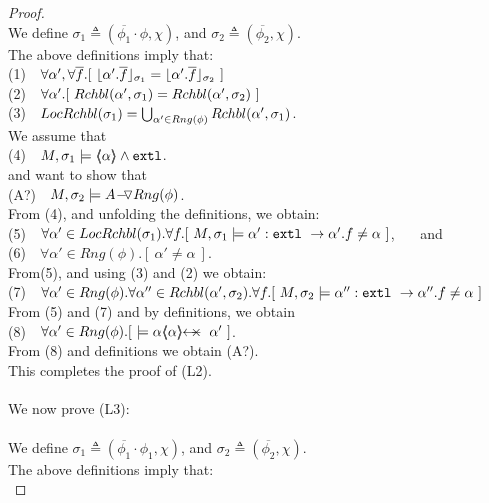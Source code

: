 \begin{proof}
  ~ \\
 We define $\sigma_1 \triangleq (\overline {\phi_1}\cdot \phi,\chi)$, and  $\sigma_2 \triangleq (\overline {\phi_2},\chi) $.\\
The above definitions imply that: \\
\SP (1)\ \ $\forall \alpha',\forall \overline f.[\  \interpret {\sigma_1} {\alpha'.\overline f} =  \interpret {\sigma_2} {\alpha'.\overline f}\ ]$\\
\SP (2)\ \ $\forall \alpha'.[\  \Relevant {\alpha'} {\sigma_1} = \Relevant {\alpha'} {\sigma_2}\ ]$\\
\SP (3)\ \ $\LRelevantO {\sigma_1} = \bigcup_{\alpha'\in Rng(\phi)} \Relevant {\alpha'} {\sigma_1}$.\\
We   assume that\\
\SP (4)\ \  $M, \sigma_1 \models \inside \alpha \wedge \extThis$.\\
and want to show that\\
\SP (A?)\ \ $M, \sigma_2 \models \PushASLong  {Rng(\phi)} {A}$.\\
From (4), and unfolding the definitions, we obtain:\\
\SP (5)\ \  $\forall \alpha'\in \LRelevantO {\sigma_1}.\forall f.[ \   M, \sigma_1 \models \alpha':\prg{extl}\ \rightarrow \alpha'.f  \neq \alpha\ ]$, \ \ \ and\\
\SP (6)\ \ $\forall \alpha'\in Rng (\phi). [ \ \alpha'\neq \alpha \ ]$.\\
From(5), and using (3) and (2) we obtain:
\\
\SP (7)\ \  $\forall \alpha'\in Rng(\phi).\forall \alpha'' \in\Relevant {\alpha'} {\sigma_2}.\forall f.[ \   M, \sigma_2 \models \alpha'':\prg{extl}\ \rightarrow \alpha''.f  \neq \alpha\ ]$\\
From (5) and (7) and by definitions, we obtain
\\
\SP (8)\ \  $\forall \alpha'\in Rng (\phi).[ \   \models \alpha \protectedFrom \alpha {\alpha'}\ ]$.\\
From (8) and definitions we obtain (A?).\\
This completes the proof of (L2). 
 \\
  $\strut ~ \ $\\
  We now prove (L3): \\
  ~ \\
 We define $\sigma_1 \triangleq (\overline {\phi_1}\cdot \phi_1,\chi)$, and  $\sigma_2 \triangleq (\overline {\phi_2},\chi) $.\\
The above definitions imply that: \\

\end{proof}
